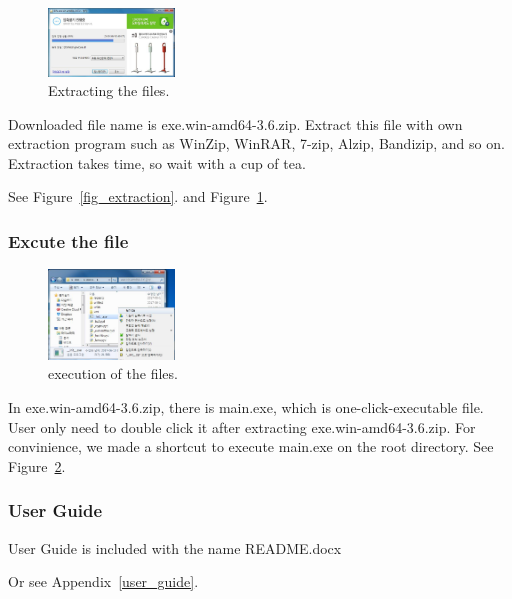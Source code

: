 \documentclass[conference]{IEEEtran}
\begin{document}
    \begin{figure}[ht]
    \centering
    \includegraphics[width=0.3\textwidth]{./figures/extracting.jpg}
    \caption{Extracting the files.}
    \label{fig_extracting}
    \end{figure}
    Downloaded file name is exe.win-amd64-3.6.zip. Extract this file with own extraction program such as WinZip, WinRAR, 7-zip, Alzip, Bandizip, and so on.
    Extraction takes time, so wait with a cup of tea.

    See Figure~\ref{fig_extraction}. and Figure~\ref{fig_extracting}.



  \subsubsection{Excute the file} 
    \begin{figure}[ht]
    \centering
    \includegraphics[width=0.3\textwidth]{./figures/execution.jpg}
    \caption{execution of the files.}
    \label{fig_excution}
    \end{figure}
  In exe.win-amd64-3.6.zip, there is main.exe, which is one-click-executable file. User only need to double click it after extracting exe.win-amd64-3.6.zip. For convinience, we made a shortcut to execute main.exe on the root directory.
  See Figure~\ref{fig_excution}.
  \subsubsection{User Guide}
  User Guide is included with the name README.docx

  Or see Appendix~\ref{user_guide}.
\end{document}
